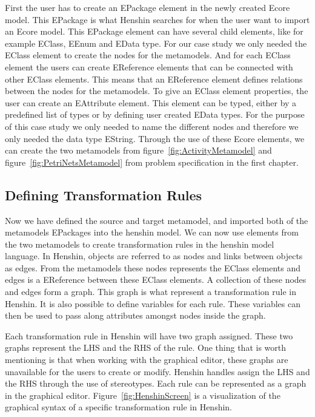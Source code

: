 \documentclass[pdftex,11pt,a4paper]{article}
\begin{document}
First the user has to create an EPackage element in the newly created Ecore
model. This EPackage is what Henshin searches for when the user want to import
an Ecore model. This EPackage element can have several child elements, like for
example EClass, EEnum and EData type. For our case study we only needed the
EClass element to create the nodes for the metamodels. And for each EClass
element the users can create EReference elements that can be connected with
other EClass elements. This means that an EReference element defines relations
between the nodes for the metamodels. To give an EClass element properties, the
user can create an EAttribute element. This element can be typed, either by a
predefined list of types or by defining user created EData types. For the
purpose of this case study we only needed to name the different nodes and
therefore we only needed the data type EString. Through the use of these Ecore
elements, we can create the two metamodels from
figure~\ref{fig:ActivityMetamodel} and figure~\ref{fig:PetriNetsMetamodel} from
problem specification in the first chapter.


\subsection{Defining Transformation Rules}

\noindent Now we have defined the source and target metamodel, and imported
both of the metamodels EPackages into the henshin model. We can now use elements
from the two metamodels to create transformation rules in the henshin model
language. In Henshin, objects are referred to as nodes and links between objects
as edges. From the metamodels these nodes represents the EClass elements and
edges is a EReference between these EClass elements. A collection of these nodes
and edges form a graph. This graph is what represent a transformation rule in
Henshin. It is also possible to define variables for each rule. These variables
can then be used to pass along attributes amongst nodes inside the
graph. 

Each transformation rule in Henshin will have two graph assigned.
These two graphs represent the LHS and the RHS of the rule. One thing that is worth mentioning is
that when working with the graphical editor, these graphs are unavailable for
the users to create or modify. Henshin handles assign the LHS and the RHS
through the use of stereotypes. Each rule can be represented as a graph in the
graphical editor. Figure~\ref{fig:HenshinScreen} is a visualization of the
graphical syntax of a specific transformation rule in Henshin.
\end{document}
